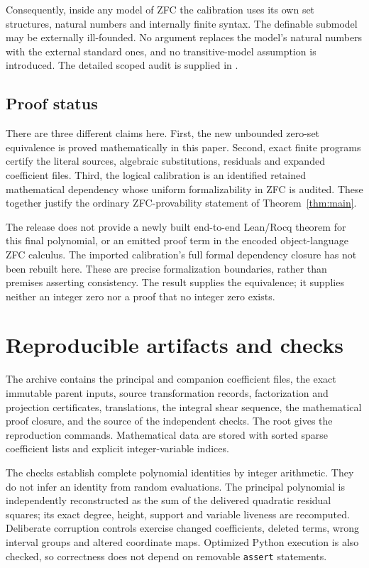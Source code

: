 \documentclass[10pt,letterpaper]{article}
\theoremstyle{definition}\newtheorem{definition}[theorem]{Definition}
\begin{document}
Consequently, inside any model of ZFC the calibration uses its own set
structures, natural numbers and internally finite syntax. The definable
submodel may be externally ill-founded. No argument replaces the model's
natural numbers with the external standard ones, and no transitive-model
assumption is introduced. The detailed scoped audit is supplied in
.

\subsection{Proof status}

There are three different claims here. First, the new unbounded
zero-set equivalence is proved mathematically in this paper. Second, exact
finite programs certify the literal sources, algebraic substitutions,
residuals and expanded coefficient files. Third, the logical calibration
is an identified retained mathematical dependency whose uniform
formalizability in ZFC is audited. These together justify the ordinary
ZFC-provability statement of Theorem~\ref{thm:main}.

The release does not provide a newly built end-to-end Lean/Rocq theorem
for this final polynomial, or an emitted proof term in the encoded
object-language ZFC calculus. The imported calibration's full formal
dependency closure has not been rebuilt here. These are precise
formalization boundaries, rather than premises asserting consistency.
The result supplies the equivalence; it supplies neither an integer zero
nor a proof that no integer zero exists.

\section{Reproducible artifacts and checks}

The archive contains the principal and companion coefficient files,
the exact immutable parent inputs, source transformation records,
factorization and projection certificates, translations, the integral
shear sequence, the mathematical proof closure, and the source of the
independent checks. The root  gives the reproduction
commands. Mathematical data are stored with sorted sparse coefficient
lists and explicit integer-variable indices.

The checks establish complete polynomial identities by integer arithmetic.
They do not infer an identity from random evaluations. The principal
polynomial is independently reconstructed as the sum of the delivered
quadratic residual squares; its exact degree, height, support and variable
liveness are recomputed. Deliberate corruption controls exercise changed
coefficients, deleted terms, wrong interval groups and altered coordinate
maps. Optimized Python execution is also checked, so correctness does not
depend on removable \texttt{assert} statements.
\end{document}
